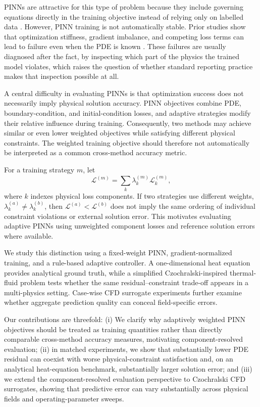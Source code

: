 \documentclass{article}
\begin{document}
PINNs are attractive for this type of problem because they include governing equations directly in the training objective instead of relying only on labelled data \citep{raissi2019physics,karniadakis2021physics}. However, PINN training is not automatically stable. Prior studies show that optimization stiffness, gradient imbalance, and competing loss terms can lead to failure even when the PDE is known \citep{wang2021gradientpathologies,krishnapriyan2021failure}. %
These failures are usually diagnosed after the fact, by inspecting which part of the physics the trained model violates, which raises the question of whether standard reporting practice makes that inspection possible at all.

A central difficulty in evaluating PINNs is that optimization success does not necessarily imply physical solution accuracy. PINN objectives combine PDE, boundary-condition, and initial-condition losses, and adaptive strategies modify their relative influence during training. Consequently, two methods may achieve similar or even lower weighted objectives while satisfying different physical constraints. The weighted training objective should therefore not automatically be interpreted as a common cross-method accuracy metric.

For a training strategy $m$, let
\begin{equation}
    \mathcal{L}^{(m)} = \sum_k \lambda_k^{(m)}\mathcal{L}_k^{(m)},
\end{equation}
where $k$ indexes physical loss components. If two strategies use different weights, $\lambda_k^{(a)}\neq\lambda_k^{(b)}$, then $\mathcal{L}^{(a)}<\mathcal{L}^{(b)}$ does not imply the same ordering of individual constraint violations or external solution error. This motivates evaluating adaptive PINNs using unweighted component losses and reference solution errors where available.

We study this distinction using a fixed-weight PINN, gradient-normalized training, and a rule-based adaptive controller. A one-dimensional heat equation provides analytical ground truth, while a simplified Czochralski-inspired thermal-fluid problem tests whether the same residual--constraint trade-off appears in a multi-physics setting. Case-wise CFD surrogate experiments further examine whether aggregate prediction quality can conceal field-specific errors.

Our contributions are threefold: (i) We clarify why adaptively weighted PINN objectives should be treated as training quantities rather than directly comparable cross-method accuracy measures, motivating component-resolved evaluation; (ii) in matched experiments, we show that substantially lower PDE residual can coexist with worse physical-constraint satisfaction and, on an analytical heat-equation benchmark, substantially larger solution error; and (iii) we extend the component-resolved evaluation perspective to Czochralski CFD surrogates, showing that predictive error can vary substantially across physical fields and operating-parameter sweeps.
\end{document}
